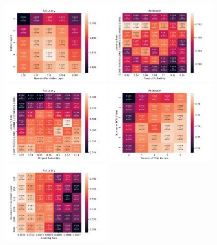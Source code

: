 \begin{figure}[htbp]
\centering
\includegraphics[width=0.49\textwidth]{Images/Calo/DNN_hl_nhl.pdf}
\includegraphics[width=0.49\textwidth]{Images/Calo/DNN_lr_dp.pdf} \\
\includegraphics[width=0.49\textwidth]{Images/Calo/CNN_lr_dp.pdf}
\includegraphics[width=0.49\textwidth]{Images/Calo/CNN_nECALfilt_nECALkern.pdf} \\
\includegraphics[width=0.49\textwidth]{Images/Calo/GN_nhl_lr.pdf}

\end{figure}
